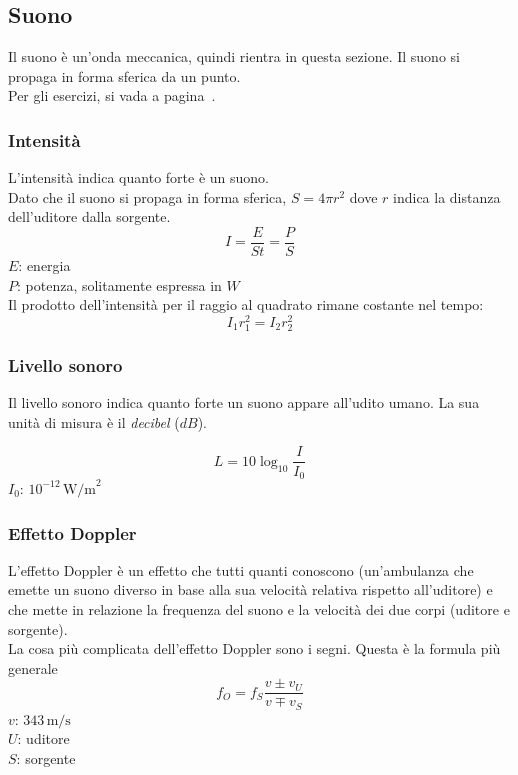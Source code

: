 \subsection{Suono}\label{subsec:onde:suono}
Il suono è un'onda meccanica, quindi rientra in questa sezione. Il suono si propaga in forma
sferica da un punto.\\[\baselineskip]
Per gli esercizi, si vada a pagina~\pageref{ex:suono}.

\subsubsection{Intensità}
L'intensità indica quanto forte è un suono. \\
Dato che il suono si propaga in forma sferica, 
$S = 4\pi r^2$ dove $r$ indica la distanza dell'uditore dalla sorgente.
\begin{equation*}
I = \frac{E}{St} = \frac{P}{S}
\end{equation*}
$E$: energia\\
$P$: potenza, solitamente espressa in $W$\\[\baselineskip]

Il prodotto dell'intensità per il raggio al quadrato rimane costante nel tempo:
\begin{equation*}
I_1r_1^2 = I_2r_2^2
\end{equation*}

\subsubsection{Livello sonoro}
Il livello sonoro indica quanto forte un suono appare all'udito umano. La sua unità di misura è il
\emph{decibel} ($dB$).

\begin{equation*}
	L = 10\log_{10}\frac{I}{I_0}
\end{equation*}
\hyperref[tab:I0]{$I_0$}: $10^{-12}\,\text{W/m}^2$

\subsubsection{Effetto Doppler}
L'effetto Doppler è un effetto che tutti quanti conoscono (un'ambulanza che emette un 
suono diverso in base alla sua velocità relativa rispetto all'uditore) e che mette in relazione la 
frequenza del suono e la velocità dei due corpi (uditore e sorgente).\\

La cosa più complicata dell'effetto Doppler sono i segni. Questa è la formula più generale
\begin{equation*}
f_O = f_S\frac{v\pm v_U}{v\mp v_S}
\end{equation*}
\hyperref[tab:vs]{$v$}: $343\,\text{m/s}$\\
$U$: uditore\\
$S$: sorgente\\

